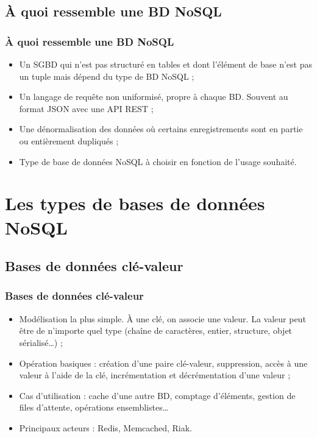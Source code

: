 \documentclass[handout]{beamer}
\begin{document}
		\subsection{À quoi ressemble une BD NoSQL}
		\begin{frame}
			\frametitle{À quoi ressemble une BD NoSQL}

			\begin{itemize}
				\item Un SGBD qui n'est pas structuré en tables et dont l'élément de base n'est pas un tuple mais dépend du type de BD NoSQL ;
				\item Un langage de requête non uniformisé, propre à chaque BD. Souvent au format JSON avec une API REST ;
				\item Une dénormalisation des données où certains enregistrements sont en partie ou entièrement dupliqués ;
				\item Type de base de données NoSQL à choisir en fonction de l'usage souhaité.
			\end{itemize}

		\end{frame}

	\section{Les types de bases de données NoSQL}

		\subsection{Bases de données clé-valeur}
		\begin{frame}
			\frametitle{Bases de données clé-valeur}

			\begin{itemize}
				\item Modélisation la plus simple. À une clé, on associe une valeur. La valeur peut être de n'importe quel type (chaîne de caractères, entier, structure, objet sérialisé\dots) ;
				\item Opération basiques : création d'une paire clé-valeur, suppression, accès à une valeur à l'aide de la clé, incrémentation et décrémentation d'une valeur ;
				\item Cas d'utilisation : cache d'une autre BD, comptage d'éléments, gestion de files d'attente, opérations ensemblistes\dots
				\item Principaux acteurs : Redis, Memcached, Riak.
			\end{itemize}

		\end{frame}
\end{document}
